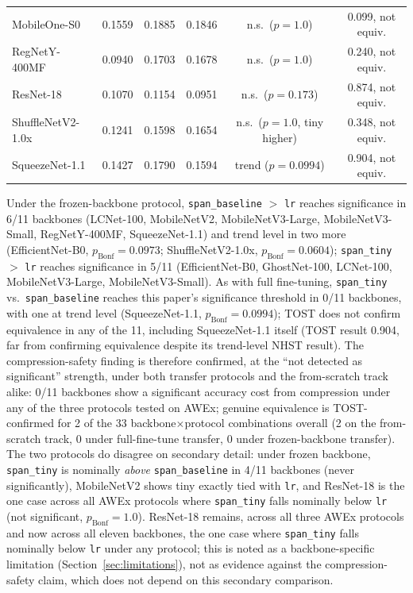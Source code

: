 \documentclass[11pt]{article}
\begin{document}
\begin{table}[H]
{\begin{tabular}{lccccc}
MobileOne-S0        & 0.1559 & 0.1885 & 0.1846 & n.s.\ ($p{=}1.0$) & 0.099, not equiv. \\
RegNetY-400MF       & 0.0940 & 0.1703 & 0.1678 & n.s.\ ($p{=}1.0$) & 0.240, not equiv. \\
ResNet-18           & 0.1070 & 0.1154 & 0.0951 & n.s.\ ($p{=}0.173$) & 0.874, not equiv. \\
ShuffleNetV2-1.0x   & 0.1241 & 0.1598 & 0.1654 & n.s.\ ($p{=}1.0$, tiny higher) & 0.348, not equiv. \\
SqueezeNet-1.1      & 0.1427 & 0.1790 & 0.1594 & trend ($p{=}0.0994$) & 0.904, not equiv. \\
\bottomrule
\end{tabular}
}
\end{table}

Under the frozen-backbone protocol, \texttt{span\_baseline} $>$ \texttt{lr} reaches significance in 6/11 backbones (LCNet-100, MobileNetV2, MobileNetV3-Large, MobileNetV3-Small, RegNetY-400MF, SqueezeNet-1.1) and trend level in two more (EfficientNet-B0, $p_{\text{Bonf}}{=}0.0973$; ShuffleNetV2-1.0x, $p_{\text{Bonf}}{=}0.0604$); \texttt{span\_tiny} $>$ \texttt{lr} reaches significance in 5/11 (EfficientNet-B0, GhostNet-100, LCNet-100, MobileNetV3-Large, MobileNetV3-Small). As with full fine-tuning, \texttt{span\_tiny} vs.\ \texttt{span\_baseline} reaches this paper's significance threshold in 0/11 backbones, with one at trend level (SqueezeNet-1.1, $p_{\text{Bonf}}{=}0.0994$); TOST does not confirm equivalence in any of the 11, including SqueezeNet-1.1 itself (TOST result 0.904, far from confirming equivalence despite its trend-level NHST result). The compression-safety finding is therefore confirmed, at the ``not detected as significant'' strength, under both transfer protocols and the from-scratch track alike: 0/11 backbones show a significant accuracy cost from compression under any of the three protocols tested on AWEx; genuine equivalence is TOST-confirmed for 2 of the 33 backbone$\times$protocol combinations overall (2 on the from-scratch track, 0 under full-fine-tune transfer, 0 under frozen-backbone transfer). The two protocols do disagree on secondary detail: under frozen backbone, \texttt{span\_tiny} is nominally \emph{above} \texttt{span\_baseline} in 4/11 backbones (never significantly), MobileNetV2 shows tiny exactly tied with \texttt{lr}, and ResNet-18 is the one case across all AWEx protocols where \texttt{span\_tiny} falls nominally below \texttt{lr} (not significant, $p_{\text{Bonf}}{=}1.0$). ResNet-18 remains, across all three AWEx protocols and now across all eleven backbones, the one case where \texttt{span\_tiny} falls nominally below \texttt{lr} under any protocol; this is noted as a backbone-specific limitation (Section~\ref{sec:limitations}), not as evidence against the compression-safety claim, which does not depend on this secondary comparison.
\end{document}

